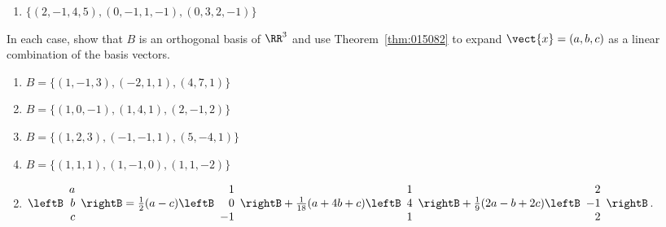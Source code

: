 \begin{multicols}{2}
\begin{ex}
\begin{enumerate}[label={\alph*.}]
\item $\{(2, -1, 4, 5), (0, -1, 1, -1), (0, 3, 2, -1)\}$

\end{enumerate}
\end{ex}

\begin{ex}
In each case, show that $B$ is an orthogonal basis of $\RR^3$ and use Theorem~\ref{thm:015082} to expand $\vect{x} = (a, b, c)$ as a linear combination of the basis vectors.

\begin{enumerate}[label={\alph*.}]
\item $B = \{(1, -1, 3), (-2, 1, 1), (4, 7, 1)\}$

\item $B = \{(1, 0, -1), (1, 4, 1), (2, -1, 2)\}$

\item $B = \{(1, 2, 3), (-1, -1, 1), (5, -4, 1)\}$

\item $B = \{(1, 1, 1), (1, -1, 0), (1, 1, -2)\}$

\end{enumerate}
\begin{sol}
\begin{enumerate}[label={\alph*.}]
\setcounter{enumi}{1}
\item  
$ \leftB \begin{array}{r}
a\\
b\\
c
\end{array} \rightB
= \frac{1}{2}(a - c)
\leftB \begin{array}{r}
1\\
0\\
-1
\end{array} \rightB
+ \frac{1}{18}(a + 4b + c)
\leftB \begin{array}{r}
1\\
4\\
1
\end{array} \rightB
+ \frac{1}{9}(2a - b + 2c)
\leftB \begin{array}{r}
2\\
-1\\
2
\end{array} \rightB$.


\end{enumerate}
\end{sol}
\end{ex}
\end{multicols}
